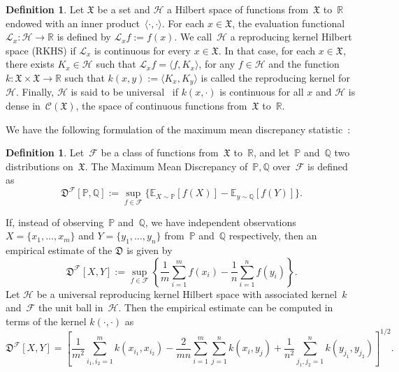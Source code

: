 \documentclass{amsart}[11pt]
\numberwithin{equation}{section}
\theoremstyle{definition}
\newtheorem{definition}[theorem]{Definition}
\newcommand{\Cc}{\mathcal{C}}
\newcommand{\Ll}{\mathcal{L}}
\newcommand{\MMD}{\mathfrak{D}}
\newcommand{\Xf}{\mathfrak{X}}
\newcommand{\RR}{\mathbb{R}}
\newcommand{\EE}{\mathbb{E}}
\newcommand{\PP}{\mathbb{P}}
\newcommand{\QQ}{\mathbb{Q}}
\newcommand{\Hh}{\mathcal{H}}
\newcommand{\Ff}{\mathcal{F}}
\begin{document}
\begin{definition}\label{def:reproducing-kernel-hilbert-space}
Let $\Xf$ be a set and $\Hh$ a Hilbert space of functions from~$\Xf$ to~$\RR$
endowed with an inner product~$\langle\cdot,\cdot\rangle$.
For each $x \in \Xf$, the evaluation functional $\Ll_x: \Hh \to \RR$ is defined by
$\Ll_{x} f := f(x)$.
We call~$\Hh$ a reproducing kernel Hilbert space (RKHS) if
$\Ll_x$ is continuous for every $x \in \Xf$.
In that case, for each $x \in \Xf$, there exists $K_x \in \Hh$ such that
$\Ll_x f = \langle f, K_x \rangle$, for any $f \in \Hh$
and the function $k: \Xf \times \Xf \to \RR$ such that $k(x, y) := \langle K_x, K_y \rangle$
is called the reproducing kernel for~$\Hh$.
Finally, $\Hh$ is said to be universal~\cite{Steinwart01} if $k(x, \cdot)$ is continuous for all $x$ and $\Hh$ is dense in~$\Cc(\Xf)$, the space of continuous functions from~$\Xf$ to~$\RR$.
\end{definition}


We have the following formulation of the maximum mean discrepancy statistic~\cite{Gretton08}:

\begin{definition}
Let~$\Ff$ be a class of functions from~$\Xf$ to~$\RR$, and let~$\PP$ and~$\QQ$ two distributions on~$\Xf$.
The Maximum Mean Discrepancy of~$\PP, \QQ$ over~$\Ff$ is defined as
\begin{equation}\label{eq:mmd}
\MMD^{\Ff}[\PP, \QQ] := \sup\limits_{f \in \Ff} \Big\{\EE_{X \sim \PP}[f(X)] - \EE_{y \sim \QQ}[f(Y)] \Big\}.
\end{equation}
\end{definition}

If, instead of observing~$\PP$ and~$\QQ$, we have independent observations $X = \{x_1, \ldots, x_m\}$ and $Y = \{y_1, \ldots, y_n\}$ from~$\PP$ and~$\QQ$ respectively,
then an empirical estimate of the $\MMD$ is given by
$$
\MMD^{\Ff}[X, Y] := \sup\limits_{f \in \Ff} \left\{\frac{1}{m} \sum_{i = 1}^{m} f(x_i) - \frac{1}{n} \sum_{i = 1}^n f(y_i) \right\}.
$$
Let $\Hh$ be a universal reproducing kernel Hilbert space with associated kernel~$k$
and~$\Ff$ the unit ball in~$\Hh$.
Then the empirical estimate can be computed in terms of the kernel $k(\cdot, \cdot)$ as
\begin{equation}
\MMD^{\Ff}[X,Y] =
\left[ \frac{1}{m^2} \sum_{i_1, i_2 = 1}^m k(x_{i_1}, x_{i_2})
 - \frac{2}{mn} \sum_{i = 1}^{m} \sum_{j = 1}^{n} k(x_i, y_j) + \frac{1}{n^2} \sum_{j_1, j_2 = 1}^n k(y_{j_1}, y_{j_2}) \right]^{1/2}.
        \label{eq:mmd-estimate}
    \end{equation}
\end{document}
